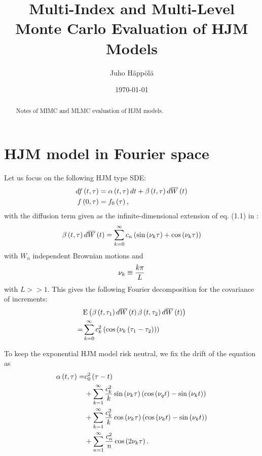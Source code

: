 \documentclass[11pt]{amsart}
\title[MIMC and MLMC HJM]{Multi-Index and Multi-Level Monte Carlo Evaluation of HJM Models}
\author{Juho H\"app\"ol\"a}
\date{\today}
\begin{document}
\begin{abstract}
Notes of MIMC and MLMC evaluation of HJM models.
\end{abstract}

\maketitle


\section{HJM model in Fourier space}

Let us focus on the following HJM type SDE:
\begin{align}
d f \left( {t,\tau} \right) &= \alpha \left( {t,\tau} \right) dt + \beta \left( {t,\tau} \right) d \overline W \left( {t} \right) \\
f \left( {0,\tau} \right) &= f_0 \left( {\tau} \right) ,
\end{align}
with the diffusion term given as the infinite-dimensional extension of
eq. (1.1) in \cite{bjork2013monte}:
\begin{align}
\beta \left( {t, \tau} \right) d \overline W \left( {t} \right) = \displaystyle\sum\limits_{k=0}^{\infty}
c_n \left( { \sin \left( {\nu_{k} \tau} \right) + \cos \left( {\nu_{k} \tau} \right) } \right)
\end{align}
with $W_n$ independent Brownian motions and
\begin{align*}
\nu_{k} \equiv \frac{k \pi }{L}
\end{align*}
with $L>>1$. This gives the following Fourier decomposition for the covariance
of increments:
\begin{align}
&\mathrm{E} \left( {{ \beta \left( {t, \tau_1} \right) d \overline W \left( {t} \right) \beta \left( {t, \tau_2} \right) d \overline W \left( {t} \right)}} \right)
\\
= & \displaystyle\sum\limits_{k=0}^{\infty} c_k^2 \left( { \cos \left( {\nu_{k} \left( {\tau_1-\tau_2} \right)} \right)} \right)
\end{align}

To keep the exponential HJM model risk neutral, we fix the drift of the equation as
\begin{align*}
\alpha \left( {t, \tau} \right) 
=&
c_0^2 \left( {\tau-t} \right)
\\
&+
\displaystyle\sum\limits_{k=1}^{\infty }
\frac{c_k^2}{k}
\sin \left( {\nu_{k} \tau } \right) \left( {\cos \left( {\nu_{q} t} \right) -  \sin \left( {\nu_{k} t} \right)} \right)
\\
&+
\displaystyle\sum\limits_{k=1}^{\infty }
\frac{c_k^2}{k}
\cos \left( { \nu_{k} \tau } \right) \left( {\cos \left( {\nu_{k} t} \right) -  \sin \left( {\nu_{k} t} \right)} \right)
\\
&+
\displaystyle\sum\limits_{n=1}^{\infty }
\frac{c_n^2}{n}
\cos \left( {2 \nu_{k} \tau } \right).
\end{align*}
\end{document}

